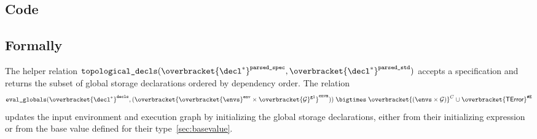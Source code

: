 \documentclass{book}
\newcommand\eqname[0]{\stackrel{\mathsmaller{\mathsf{is}}}{=}}
\newcommand\eqdef[0]{:=}
\newcommand\overname[2]{\overbracket{#1}^{#2}}
\newcommand\XGraphs[0]{\mathcal{G}}
\newcommand\ordered[3]{{#1}\xrightarrow{#2}{#3}}
\newcommand\evalarrow[0]{\stackrel{\mathsf{asl}}{\rightsquigarrow}}
\newcommand\aslrel[0]{\bigtimes}
\newcommand\sslash[0]{\mathbin{/\mkern-6mu/}}
\newcommand\terminateas[0]{\;\sslash\;}
\newcommand\ErrorConfig[0]{\texttt{\#E}}
\newcommand\TError[0]{\textsf{TError}}
\newcommand\evalexprsef[1]{\texttt{eval\_expr\_sef}(#1)}
\newcommand\parsedspec[0]{\texttt{parsed\_spec}}
\newcommand\parsedstd[0]{\texttt{parsed\_std}}
\newcommand\topologicaldecls[0]{\texttt{topological\_decls}}
\newcommand\evalglobals[0]{\texttt{eval\_globals}}
\newcommand\env[0]{\texttt{env}}
\newcommand\envone[0]{\texttt{env1}}
\newcommand\envtwo[0]{\texttt{env2}}
\newcommand\vv[0]{\texttt{v}}
\newcommand\vt[0]{\texttt{t}}
\newcommand\vgone[0]{\texttt{g1}}
\newcommand\vgtwo[0]{\texttt{g2}}
\newcommand\name[0]{\texttt{name}}
\newcommand\envm[0]{\texttt{envm}}
\newcommand\vd[0]{\texttt{d}}
\newcommand\vdecls[0]{\texttt{decls}}
\begin{document}
  \subsection{Code}

\begin{emptyformal}
  \subsection{Formally}
  The helper relation $\topologicaldecls(\overname{\decl^*}{\parsedspec}, \overname{\decl^*}{\parsedstd})$
  accepts a specification and returns the subset of global storage declarations ordered by
  dependency order.
  The relation
  \[
    \evalglobals(\overname{\decl^*}{\vdecls}, (\overname{\overname{\envs}{\env} \times \overname{\XGraphs}{\vgone}}{\envm}))
    \;\aslrel\; \overname{(\envs \times \XGraphs)}{C} \cup \overname{\TError}{\ErrorConfig}
  \]
  updates the input environment and execution graph by initializing the global storage declarations,
  either from their initializing expression or from the base value defined for their type~\ref{sec:basevalue}.



\end{emptyformal}
\end{document}

